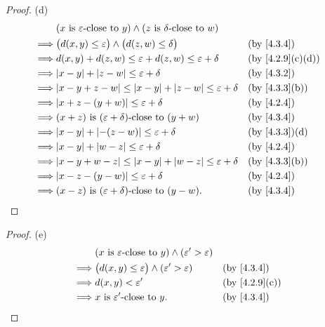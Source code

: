 \begin{proof}{(d)}
  \begin{align*}
             & (x \text{ is \(\varepsilon\)-close to } y) \land (z \text{ is \(\delta\)-close to } w)                                     \\
    \implies & \big(d(x, y) \leq \varepsilon\big) \land \big(d(z, w) \leq \delta\big)                 &  & \by{4.3.4}                     \\
    \implies & d(x, y) + d(z, w) \leq \varepsilon + d(z, w) \leq \varepsilon + \delta                 &  & \text{(by \cref{4.2.9}(c)(d))} \\
    \implies & \abs{x - y} + \abs{z - w} \leq \varepsilon + \delta                                    &  & \by{4.3.2}                     \\
    \implies & \abs{x - y + z - w} \leq \abs{x - y} + \abs{z - w} \leq \varepsilon + \delta           &  & \text{(by \cref{4.3.3}(b))}    \\
    \implies & \abs{x + z - (y + w)} \leq \varepsilon + \delta                                        &  & \by{4.2.4}                     \\
    \implies & (x + z) \text{ is \((\varepsilon + \delta)\)-close to } (y + w)                        &  & \by{4.3.4}                     \\
    \implies & \abs{x - y} + \abs{-(z - w)} \leq \varepsilon + \delta                                 &  & \text{(by \cref{4.3.3})(d)}    \\
    \implies & \abs{x - y} + \abs{w - z} \leq \varepsilon + \delta                                    &  & \by{4.2.4}                     \\
    \implies & \abs{x - y + w - z} \leq \abs{x - y} + \abs{w - z} \leq \varepsilon + \delta           &  & \text{(by \cref{4.3.3}(b))}    \\
    \implies & \abs{x - z - (y - w)} \leq \varepsilon + \delta                                        &  & \by{4.2.4}                     \\
    \implies & (x - z) \text{ is \((\varepsilon + \delta)\)-close to } (y - w).                       &  & \by{4.3.4}
  \end{align*}
\end{proof}

\begin{proof}{(e)}
  \begin{align*}
             & (x \text{ is \(\varepsilon\)-close to } y) \land (\varepsilon' > \varepsilon)                                  \\
    \implies & \big(d(x, y) \leq \varepsilon\big) \land (\varepsilon' > \varepsilon)         &  & \by{4.3.4}                  \\
    \implies & d(x, y) < \varepsilon'                                                        &  & \text{(by \cref{4.2.9}(c))} \\
    \implies & x \text{ is \(\varepsilon'\)-close to } y.                                    &  & \by{4.3.4}
  \end{align*}
\end{proof}

